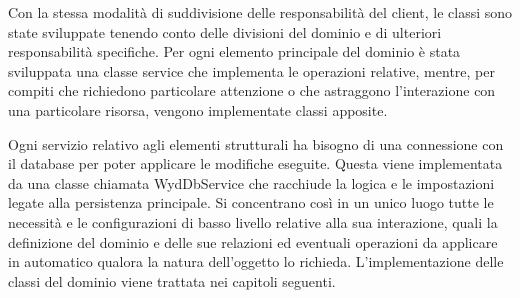 Con la stessa modalità di suddivisione delle responsabilità del client,
le classi sono state sviluppate tenendo conto delle divisioni del dominio
e di ulteriori responsabilità specifiche.
Per ogni elemento principale del dominio è stata sviluppata una classe service che implementa le operazioni relative,
mentre, per compiti che richiedono particolare attenzione o che astraggono l'interazione con una particolare risorsa,
vengono implementate classi apposite.\\
\clearpage


Ogni servizio relativo agli elementi strutturali ha bisogno di una connessione con il database
per poter applicare le modifiche eseguite.
Questa viene implementata da una classe chiamata WydDbService che racchiude la logica
e le impostazioni legate alla persistenza principale.
Si concentrano così in un unico luogo tutte le necessità e
le configurazioni di basso livello relative alla sua interazione,
quali la definizione del dominio e delle sue relazioni ed
eventuali operazioni da applicare in automatico qualora la natura dell'oggetto lo richieda.
L'implementazione delle classi del dominio viene trattata nei capitoli seguenti.\\

